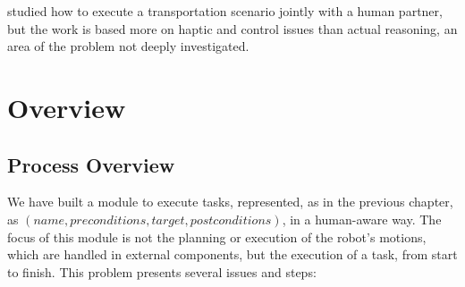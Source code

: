 \cite{bussy2012proactive} studied how to execute a transportation scenario jointly with a human partner, but the work is based more on haptic and control issues than actual reasoning, an area of the problem not deeply investigated.


\section{Overview}
\label{sec:task_execution-overview}

\subsection{Process Overview}

We have built a module to execute tasks, represented, as in the previous chapter, as $(name, preconditions, target, postconditions)$, in a human-aware way. The focus of this module is not the planning or execution of the robot's motions, which are handled in external components, but the  execution of a task, from start to finish. This problem presents several issues and steps:

